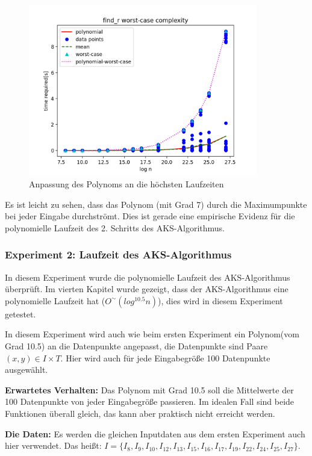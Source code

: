 \documentclass[12pt,oneside]{article}
\theoremstyle{remark}
\theoremstyle{definition}
\begin{document}
\begin{figure}[h]
\includegraphics[width=10cm]{plots/find_r_worst_case.png}
\centering
\caption{Anpassung des Polynoms an die höchsten Laufzeiten}
\label{runtime-aks}
\end{figure}

Es ist leicht zu sehen, dass das Polynom (mit Grad 7) durch die Maximumpunkte bei jeder Eingabe durchströmt. Dies ist gerade eine empirische Evidenz für die polynomielle Laufzeit des 2. Schritts des AKS-Algorithmus.  







\subsubsection{Experiment 2: Laufzeit des AKS-Algorithmus}
In diesem Experiment wurde die polynomielle Laufzeit des AKS-Algorithmus überprüft. Im vierten Kapitel wurde gezeigt, dass der AKS-Algorithmus eine polynomielle Laufzeit hat ($O^{\sim}(log^{10.5} n)$), dies wird in diesem Experiment getestet.

\textbf{}\newline
In diesem Experiment wird auch wie beim ersten Experiment ein Polynom(vom Grad 10.5) an die Datenpunkte  angepasst, die Datenpunkte sind Paare $(x,y) \in I \times T$. Hier wird auch für jede Eingabegröße 100 Datenpunkte ausgewählt. 

\textbf{\small{Erwartetes Verhalten:}}
Das Polynom mit Grad 10.5 soll die Mittelwerte der 100 Datenpunkte von jeder Eingabegröße passieren. Im idealen Fall sind beide Funktionen überall gleich, das kann aber praktisch nicht erreicht werden.

\textbf{\small{Die Daten:}}
Es werden die gleichen Inputdaten aus dem ersten Experiment auch hier verwendet. Das heißt: $I = \{ I_{8},I_{9},I_{10},I_{12},I_{13},I_{15},I_{16},I_{17},I_{19},I_{22},I_{24},I_{25},I_{27} \}$.
\end{document}

